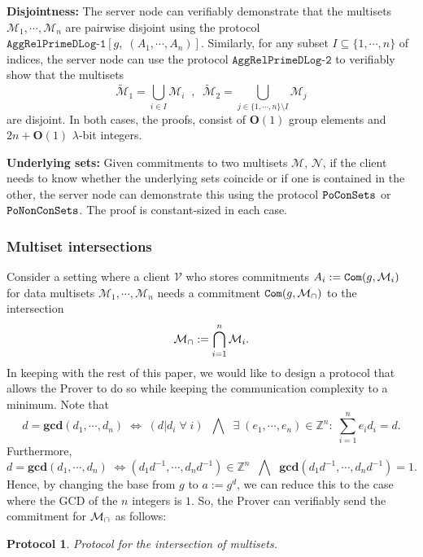 \documentclass[11pt, lettersize, notitlepage, leqno, footskip=0.6cm]{article}
\newcommand{\bz}{\mathbb Z}
\newcommand{\ttt}{\texttt}
\newcommand{\LRA}{\Longleftrightarrow}
\newcommand{\wti}{\widetilde}
\newcommand{\mc}{\mathcal}
\newcommand{\mbf}{\mathbf}
\newcommand{\sm}{\setminus}
\newcommand{\lam}{\lambda}
\newcommand{\sub}{\subseteq}
\newcommand{\bO}{\mbf{O}}
\newcommand{\mcM}{\mc{M}}
\newcommand{\vs}{\vspace{-0.15cm}}
\newcommand{\noin}{\noindent}
\newcommand{\GCD}{\mbf{gcd}}
\newtheorem{Prot}[Thm]{Protocol}
\numberwithin{equation}{section}
\begin{document}
\bigskip


\noin \textbf{Disjointness:} The server node can verifiably demonstrate that the multisets $\mcM_1,\cdots,\mcM_n$ are pairwise disjoint using the protocol $\ttt{AggRelPrimeDLog-1}[g,\;(A_1,\cdots,A_n)]$. Similarly, for any subset $I\sub\{1,\cdots,n \}$ of indices, the server node can use the protocol $\ttt{AggRelPrimeDLog-2}$ to verifiably show that the multisets \vs $$\wti{\mcM}_1 = \bigcup\limits_{i\in I}\mcM_i\;\;,\;\;\wti{\mcM}_2 = \bigcup\limits_{j\in \{1,\cdots,n\}\sm I}\mcM_j $$ are disjoint. In both cases, the proofs, consist of $\bO(1)$ group elements and $2n+\bO(1)$ $\lam$-bit integers.

\bigskip

\noin \textbf{Underlying sets:} Given commitments to two multisets $\mc{M}$, $\mc{N}$, if the client needs to know whether the underlying sets coincide or if one is contained in the other, the server  node can demonstrate this using the protocol $\tt{PoConSets}$ or  $\tt{PoNonConSets}$. The proof is constant-sized in each case.

\subsubsection{\fontsize{11}{11}\selectfont Multiset intersections }

\noin Consider a setting where a client $\mc{V}$ who stores commitments $A_i:= \protect{\ttt{Com}}(g, \mc{M}_i)$ for data multisets $\mc{M}_1, \cdots, \mc{M}_n$ needs a commitment $\protect{\verb|Com|}(g, \mc{M}_{\tt{\cap}})$ to the intersection \vs $$\mc{M}_{\tt{\cap}}:=\bigcap\limits_{i=1}^n \mc{M}_i .$$ In keeping with the rest of this paper, we would like to design a protocol that allows the Prover to do so while keeping the communication complexity to a minimum. Note that \vs $$d = \GCD(d_1,\cdots,d_n)\; \LRA\; (d|d_i\;\forall\;i)\;\;\bigwedge\;\; \exists\;(e_1,\cdots,e_n)\in\bz^n:\;\sum_{i=1}^n e_id_i = d .$$\vs Furthermore, \vs $$d = \GCD(d_1,\cdots,d_n)\; \LRA \left({d_1}{d}^{-1},\cdots, {d_n}{d}^{-1}\right)\in \bz^n\;\;\bigwedge\;\; \GCD\left({d_1}{d}^{-1},\cdots, {d_n}{d}^{-1}\right)=1.$$ Hence, by changing the base from $g$ to $a:= g^d$, we can reduce this to the case where the GCD of the $n$ integers is $1$. So, the Prover can verifiably send the commitment for $\mc{M}_{\tt{\cap}}$ as follows: \vspace{0.1cm}


\begin{Prot} Protocol for the intersection of multisets.\end{Prot} \vspace{-0.3cm}
\end{document}
